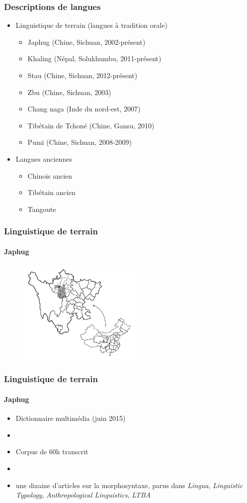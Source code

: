 \documentclass[xcolor=table]{beamer}
\begin{document}
 
   
   \begin{frame} 
 \frametitle{Descriptions de langues} 
  \begin{itemize}
\item Linguistique de terrain (langues à tradition orale)
 \begin{itemize}%
\item Japhug (Chine, Sichuan, 2002-présent)  
\item Khaling (Népal, Solukhumbu, 2011-présent)
\item Stau (Chine, Sichuan, 2012-présent)
\item Zbu (Chine, Sichuan, 2003)
\item Chang naga (Inde du nord-est, 2007)
\item Tibétain de Tchoné (Chine, Gansu, 2010) 
\item Pumi (Chine, Sichuan, 2008-2009)
\end{itemize}
\item Langues anciennes
 \begin{itemize}%
\item Chinois ancien
\item Tibétain ancien
\item Tangoute
\end{itemize}
\end{itemize}

\end{frame} 
   
      \begin{frame} 
 \frametitle{Linguistique de terrain} 
  \framesubtitle{Japhug} 
    \begin{figure}[H]
\centering
\includegraphics[height=50mm]{carte.JPG}
\end{figure}   
       \end{frame} 
       
      \begin{frame} 
 \frametitle{Linguistique de terrain} 
  \framesubtitle{Japhug} 
 \begin{itemize}%
\item Dictionnaire multimédia (juin 2015)
\item {}
\item Corpus de 60h transcrit
\item {}  
\item une dizaine d'articles sur la morphosyntaxe, parus dans \textit{Lingua}, \textit{Linguistic Typology}, \textit{Anthropological Linguistics}, \textit{LTBA}
\end{itemize}
    \end{frame} 
    
\end{document}
